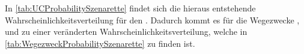 

In \autoref{tab:UCProbabilitySzenarette} findet sich die hieraus entstehende Wahrscheinlichkeitsverteilung für den \UC \Firmeparkplatzdot.
Dadurch kommt es für die Wegezwecke \Arbeitdot, \dienst und \Ausbildung zu einer veränderten Wahrscheinlichkeitsverteilung, welche in \autoref{tab:WegezweckProbabilitySzenarette} zu finden ist.



